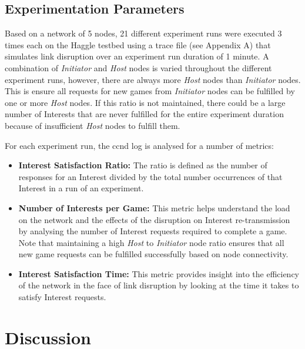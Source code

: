 \documentclass[a4paper,12pt]{report}      %
\begin{document}
\begin{descripton}
\subsection{Experimentation Parameters} 

Based on a network of 5 nodes, 21 different experiment runs were executed 3 times each on the Haggle testbed
using a trace file (see Appendix A) that simulates link disruption over an experiment run duration of 1 minute. A
combination of \emph{Initiator} and \emph{Host} nodes is varied throughout the different experiment runs, however, there are always
more \emph{Host} nodes than \emph{Initiator} nodes. This is ensure all requests for new games from \emph{Initiator} nodes can be fulfilled
by one or more \emph{Host} nodes. If this ratio is not maintained, there could be a large number of Interests that are never
fulfilled for the entire experiment duration because of insufficient \emph{Host} nodes to fulfill them. 


\noindent For each experiment run, the ccnd log is analysed for a number of metrics:

\begin{itemize}
\item \textbf{Interest Satisfaction Ratio:} The ratio is defined as the number of responses for an Interest divided
 by the total number occurrences of that Interest in a run of an experiment.

\item \textbf{Number of Interests per Game:} This metric helps understand the load on the network and the
effects of the disruption on Interest re-transmission by analysing the number of Interest requests
required to complete a game. Note that maintaining a high \emph{Host} to \emph{Initiator} node ratio ensures
that all new game requests can be fulfilled successfully based on node connectivity.

\item \textbf{Interest Satisfaction Time:} This metric provides insight into the efficiency of the network in the
face of link disruption by looking at the time it takes to satisfy Interest requests.
\end{itemize}

\section{Discussion}


\end{descripton}
\end{document}

